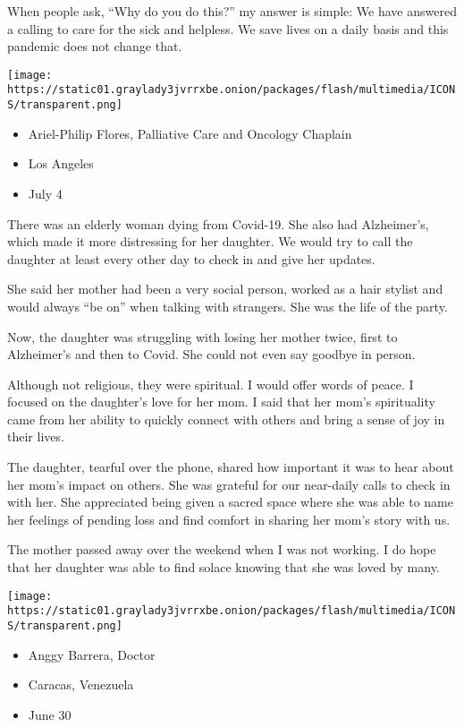 When people ask, ``Why do you do this?'' my answer is simple: We have
answered a calling to care for the sick and helpless. We save lives on a
daily basis and this pandemic does not change that.

\texttt{[image: https://static01.graylady3jvrrxbe.onion/packages/flash/multimedia/ICONS/transparent.png]}

\begin{itemize}
\tightlist
\item
  Ariel-Philip Flores, Palliative Care and Oncology Chaplain
\item
  Los Angeles
\item
  July 4
\end{itemize}

There was an elderly woman dying from Covid-19. She also had
Alzheimer's, which made it more distressing for her daughter. We would
try to call the daughter at least every other day to check in and give
her updates.

She said her mother had been a very social person, worked as a hair
stylist and would always ``be on'' when talking with strangers. She was
the life of the party.

Now, the daughter was struggling with losing her mother twice, first to
Alzheimer's and then to Covid. She could not even say goodbye in person.

Although not religious, they were spiritual. I would offer words of
peace. I focused on the daughter's love for her mom. I said that her
mom's spirituality came from her ability to quickly connect with others
and bring a sense of joy in their lives.

The daughter, tearful over the phone, shared how important it was to
hear about her mom's impact on others. She was grateful for our
near-daily calls to check in with her. She appreciated being given a
sacred space where she was able to name her feelings of pending loss and
find comfort in sharing her mom's story with us.

The mother passed away over the weekend when I was not working. I do
hope that her daughter was able to find solace knowing that she was
loved by many.

\texttt{[image: https://static01.graylady3jvrrxbe.onion/packages/flash/multimedia/ICONS/transparent.png]}

\begin{itemize}
\tightlist
\item
  Anggy Barrera, Doctor
\item
  Caracas, Venezuela
\item
  June 30
\end{itemize}

